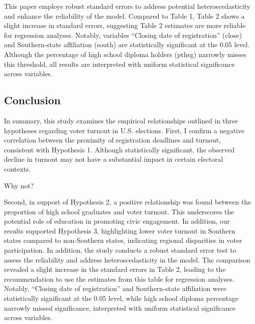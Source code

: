 \documentclass[
  letterpaper,
  DIV=11,
  numbers=noendperiod]{scrartcl}
\begin{document}
This paper employs robust standard errors to address potential
heteroscedasticity and enhance the reliability of the model. Compared to
Table 1, Table 2 shows a slight increase in standard errors, suggesting
Table 2 estimates are more reliable for regression analyses. Notably,
variables ``Closing date of registration'' (close) and Southern-state
affiliation (south) are statistically significant at the 0.05 level.
Although the percentage of high school diploma holders (pthsg) narrowly
misses this threshold, all results are interpreted with uniform
statistical significance across variables.

\hypertarget{conclusion}{%
\subsection{Conclusion}\label{conclusion}}

In summary, this study examines the empirical relationships outlined in
three hypotheses regarding voter turnout in U.S. elections. First, I
confirm a negative correlation between the proximity of registration
deadlines and turnout, consistent with Hypothesis 1. Although
statistically significant, the observed decline in turnout may not have
a substantial impact in certain electoral contexts.

\begin{tcolorbox}[enhanced jigsaw, titlerule=0mm, colframe=quarto-callout-note-color-frame, rightrule=.15mm, coltitle=black, leftrule=.75mm, breakable, colback=white, toprule=.15mm, left=2mm, bottomrule=.15mm, colbacktitle=quarto-callout-note-color!10!white, opacityback=0, arc=.35mm, bottomtitle=1mm, opacitybacktitle=0.6, title=\textcolor{quarto-callout-note-color}{\faInfo}\hspace{0.5em}{Note}, toptitle=1mm]

Why not?

\end{tcolorbox}

Second, in support of Hypothesis 2, a positive relationship was found
between the proportion of high school graduates and voter turnout. This
underscores the potential role of education in promoting civic
engagement. In addition, our results supported Hypothesis 3,
highlighting lower voter turnout in Southern states compared to
non-Southern states, indicating regional disparities in voter
participation. In addition, the study conducts a robust standard error
test to assess the reliability and address heteroscedasticity in the
model. The comparison revealed a slight increase in the standard errors
in Table 2, leading to the recommendation to use the estimates from this
table for regression analyses. Notably, ``Closing date of registration''
and Southern-state affiliation were statistically significant at the
0.05 level, while high school diploma percentage narrowly missed
significance, interpreted with uniform statistical significance across
variables.
\end{document}
